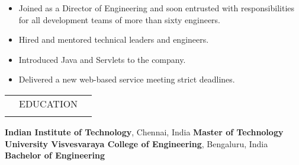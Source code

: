 \documentclass[a4paper, 14pt,line]{extarticle}
\begin{document}
\begin{itemize}
\item Joined as a Director of Engineering and soon entrusted with
responsibilities for all development teams of more than sixty engineers.
\item Hired and mentored technical leaders and engineers.
\item Introduced Java and Servlets to the company.
\item Delivered a new web-based service meeting strict deadlines.
\end{itemize}

\begin{table}[H]
{\renewcommand{\arraystretch}{1.9}
\begin{tabularx}{\textwidth}{XcX}
\hline\hline\Xhline{2.5\arrayrulewidth}
\rowcolor{Gray}      &EDUCATION& \\
\Xhline{2.5\arrayrulewidth}
\hline
\end{tabularx}
}
\end{table}

\noindent\textbf{Indian Institute of Technology}, Chennai, India \hfill \textbf{Master of Technology}\vspace{1mm}\\
\textbf{University Visvesvaraya College of Engineering}, Bengaluru, India \hfill \textbf{Bachelor of Engineering}\vspace{-1.5mm}\\%
\end{document}
